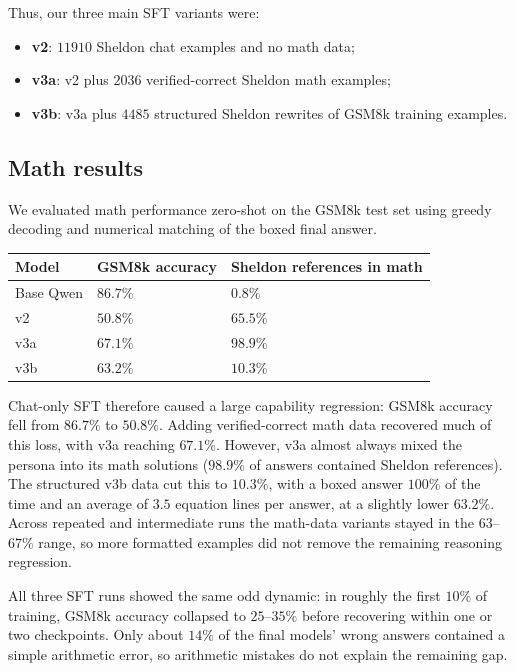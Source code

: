 \documentclass[9pt]{extarticle}
\begin{document}
Thus, our three main SFT variants were:
\begin{itemize}
    \item \textbf{v2}: $11910$ Sheldon chat examples and no math data;
    \item \textbf{v3a}: v2 plus $2036$ verified-correct Sheldon math examples;
    \item \textbf{v3b}: v3a plus $4485$ structured Sheldon rewrites of GSM8k training examples.
\end{itemize}

\subsection{Math results}

We evaluated math performance zero-shot on the GSM8k test set using greedy decoding and numerical matching of the boxed final answer.

\begin{table}[ht]
\centering
\begin{tabular}{|l|l|l|}
\hline
Model & GSM8k accuracy & Sheldon references in math \\ \hline
Base Qwen & $86.7\%$ & $0.8\%$ \\ \hline
v2 & $50.8\%$ & $65.5\%$ \\ \hline
v3a & $67.1\%$ & $98.9\%$ \\ \hline
v3b & $63.2\%$ & $10.3\%$ \\ \hline
\end{tabular}
\end{table}

Chat-only SFT therefore caused a large capability regression: GSM8k accuracy fell from $86.7\%$ to $50.8\%$. Adding verified-correct math data recovered much of this loss, with v3a reaching $67.1\%$. However, v3a almost always mixed the persona into its math solutions ($98.9\%$ of answers contained Sheldon references). The structured v3b data cut this to $10.3\%$, with a boxed answer $100\%$ of the time and an average of $3.5$ equation lines per answer, at a slightly lower $63.2\%$. Across repeated and intermediate runs the math-data variants stayed in the $63$--$67\%$ range, so more formatted examples did not remove the remaining reasoning regression.

All three SFT runs showed the same odd dynamic: in roughly the first $10\%$ of training, GSM8k accuracy collapsed to $25$--$35\%$ before recovering within one or two checkpoints. Only about $14\%$ of the final models' wrong answers contained a simple arithmetic error, so arithmetic mistakes do not explain the remaining gap.
\end{document}
